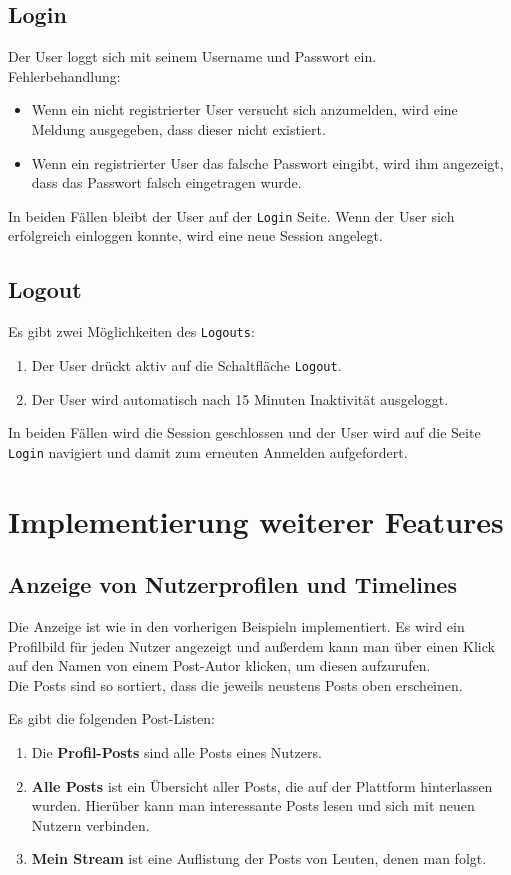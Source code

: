 \subsection{Login}
Der User loggt sich mit seinem Username und Passwort ein. \\
Fehlerbehandlung:
\begin{itemize}
  \item Wenn ein nicht registrierter User versucht sich anzumelden, wird eine Meldung ausgegeben, dass dieser nicht existiert.
  \item Wenn ein registrierter User das falsche Passwort eingibt, wird ihm angezeigt, dass das Passwort falsch eingetragen wurde.
\end{itemize}
In beiden Fällen bleibt der User auf der \texttt{Login} Seite.
Wenn der User sich erfolgreich einloggen konnte, wird eine neue Session angelegt.

\subsection{Logout}
Es gibt zwei Möglichkeiten des \texttt{Logouts}:
\begin{enumerate}
  \item Der User drückt aktiv auf die Schaltfläche \texttt{Logout}.
  \item Der User wird automatisch nach 15 Minuten Inaktivität ausgeloggt.
\end{enumerate}
In beiden Fällen wird die Session geschlossen und der User wird auf die Seite \texttt{Login} navigiert und damit zum erneuten Anmelden aufgefordert.

\newpage
\section{Implementierung weiterer Features}
\subsection{Anzeige von Nutzerprofilen und Timelines}
Die Anzeige ist wie in den vorherigen Beispieln implementiert. Es wird ein Profilbild für jeden Nutzer angezeigt und außerdem kann man über einen Klick auf den Namen von einem Post-Autor klicken, um diesen aufzurufen.\\
Die Posts sind so sortiert, dass die jeweils neustens Posts oben erscheinen.

Es gibt die folgenden Post-Listen:
\begin{enumerate}
\item Die \textbf{Profil-Posts} sind alle Posts eines Nutzers.
\item \textbf{Alle Posts} ist ein Übersicht aller Posts, die auf der Plattform hinterlassen wurden. Hierüber kann man interessante Posts lesen und sich mit neuen Nutzern verbinden.
\item \textbf{Mein Stream} ist eine Auflistung der Posts von Leuten, denen man folgt.
\end{enumerate}

